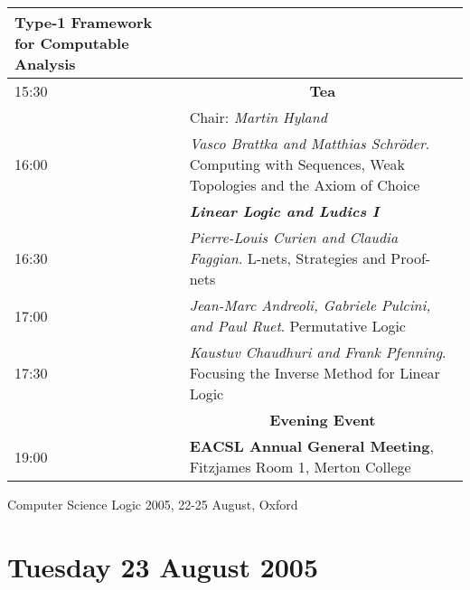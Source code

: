 \documentclass[landscape,12pt]{article}
\newcommand\textbfit[1]{{\bf\em #1}\index{#1}}
\begin{document}
\begin{tabular}{p{1cm}p{21cm}}
Type-1 Framework for Computable Analysis\\
\hline
15:30 & \multicolumn{1}{c}{\bf Tea}\\
\hline
& Chair: \emph{Martin Hyland}\\
16:00 & 	\emph{Vasco Brattka and Matthias Schr\"oder}. Computing with Sequences, Weak Topologies and the Axiom of Choice\\
	& \textbfit{Linear Logic and Ludics I}\\
16:30 & 	\emph{Pierre-Louis Curien and Claudia Faggian}. L-nets, Strategies and Proof-nets\\
17:00 & 	\emph{Jean-Marc Andreoli, Gabriele Pulcini, and Paul Ruet}. Permutative Logic\\
17:30 & 	\emph{Kaustuv Chaudhuri and Frank Pfenning}. Focusing the Inverse Method for Linear Logic\\
\hline
	& \multicolumn{1}{c}{\textbf{Evening Event}}\\
\hline
19:00 & 	\textbf{EACSL Annual General Meeting}, Fitzjames Room 1, Merton College
\end{tabular}

\newpage

\begin{center}
\LARGE\sc Computer Science Logic 2005, 22-25 August, Oxford
\end{center}


\section*{Tuesday 23 August 2005}
\end{document}
